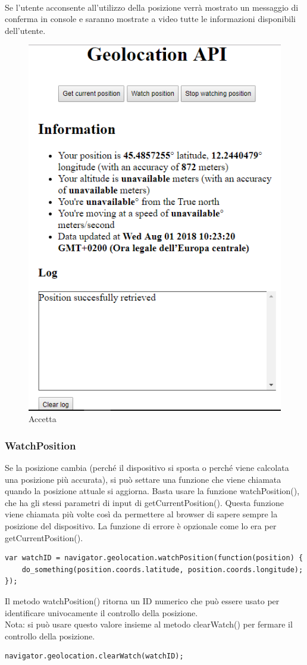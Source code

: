 \documentclass[11pt ,a4paper , twoside , openright ]{article}
\begin{document}
\pagebreak
\\
Se l'utente acconsente all'utilizzo della posizione verrà mostrato un messaggio di conferma in console e saranno mostrate a video tutte le informazioni disponibili dell'utente.
\begin{figure}[h]
	\centering
	\includegraphics[width=0.5\linewidth]{geo4}
	\caption{Accetta}
	\label{fig: Accetta}
\end{figure}
\pagebreak
\subsubsection{WatchPosition}
Se la posizione cambia (perché il dispositivo si sposta o perché viene calcolata una posizione più accurata), si può settare una funzione che viene chiamata quando la posizione attuale si aggiorna. Basta usare la funzione watchPosition(), che ha gli stessi parametri di input di getCurrentPosition(). Questa funzione viene chiamata più volte così da permettere al browser di sapere sempre la posizione del dispositivo. La funzione di errore è opzionale come lo era per getCurrentPosition().

\begin{lstlisting}
var watchID = navigator.geolocation.watchPosition(function(position) {
	do_something(position.coords.latitude, position.coords.longitude);
});
\end{lstlisting}
Il metodo watchPosition() ritorna un ID numerico che può essere usato per identificare univocamente il controllo della posizione. 
\\
Nota: si può usare questo valore insieme al metodo clearWatch() per fermare il controllo della posizione.
\begin{lstlisting}
navigator.geolocation.clearWatch(watchID);
\end{lstlisting}
\end{document}
